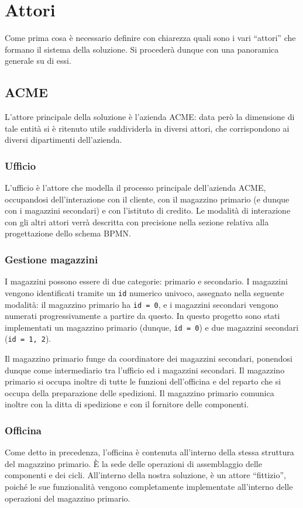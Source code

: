 \section{Attori}
Come prima cosa \`e necessario definire con chiarezza quali sono i vari
``attori'' che formano il sistema della soluzione.
Si proceder\`a dunque con una panoramica generale su di essi.

\subsection{ACME}
L'attore principale della soluzione \`e l'azienda ACME: data per\`o la
dimensione di tale entit\`a si \`e ritenuto utile suddividerla in
diversi attori, che corrispondono ai diversi dipartimenti dell'azienda.

\subsubsection{Ufficio}
L'ufficio \`e l'attore che modella il processo principale dell'azienda
ACME, occupandosi dell'interazione con il cliente, con il magazzino
primario (e dunque con i magazzini secondari) e con l'istituto di
credito. Le modalit\`a di interazione con gli altri attori verr\`a
descritta con precisione nella sezione relativa alla progettazione dello
schema BPMN.

\subsubsection{Gestione magazzini}
I magazzini possono essere di due categorie: primario e secondario.
I magazzini vengono identificati tramite un {\tt id} numerico univoco,
assegnato nella seguente modalit\`a: il magazzino primario ha
{\tt id = 0}, e i magazzini secondari vengono numerati progressivamente
a partire da questo. In questo progetto sono stati implementati un
magazzino primario (dunque, {\tt id = 0}) e due magazzini secondari
({\tt id = 1, 2}).

Il magazzino primario funge da coordinatore dei magazzini secondari,
ponendosi dunque come intermediario tra l'ufficio ed i magazzini
secondari. \linebreak
Il magazzino primario si occupa inoltre di tutte le funzioni
dell'officina e del reparto che si occupa della preparazione delle
spedizioni.
Il magazzino primario comunica inoltre con la ditta di spedizione e con
il fornitore delle componenti.

\subsubsection{Officina}
Come detto in precedenza, l'officina \`e contenuta all'interno della
stessa struttura del magazzino primario. \`E la sede delle operazioni di
assemblaggio delle componenti e dei cicli. All'interno della nostra
soluzione, \`e un attore ``fittizio'', poich\'e le sue funzionalit\`a
vengono completamente implementate all'interno delle operazioni del
magazzino primario.

